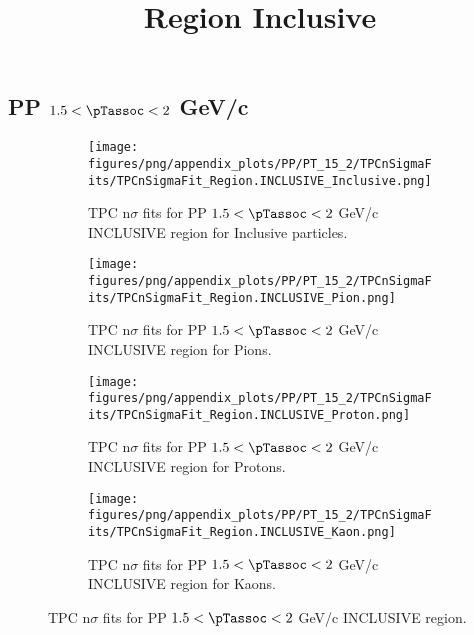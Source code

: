     
            \subsection*{PP $1.5 < \pTassoc < 2$ GeV/c}
            \begin{figure}[H]
                \title{Region Inclusive}
                \begin{subfigure}[b]{0.5\textwidth}
                    \centering
                    \texttt{[image: figures/png/appendix\_plots/PP/PT\_15\_2/TPCnSigmaFits/TPCnSigmaFit\_Region.INCLUSIVE\_Inclusive.png]}
                    \caption{TPC n$\sigma$ fits for PP $1.5 < \pTassoc < 2$ GeV/c INCLUSIVE region for Inclusive particles.}
                    \label{fig:appendix_PP_$1.5 < \pTassoc < 2$ GeV/c_INCLUSIVE_Inclusive}
                \end{subfigure}
                \begin{subfigure}[b]{0.5\textwidth}
                    \centering
                    \texttt{[image: figures/png/appendix\_plots/PP/PT\_15\_2/TPCnSigmaFits/TPCnSigmaFit\_Region.INCLUSIVE\_Pion.png]}
                    \caption{TPC n$\sigma$ fits for PP $1.5 < \pTassoc < 2$ GeV/c INCLUSIVE region for Pions.}
                    \label{fig:appendix_PP_$1.5 < \pTassoc < 2$ GeV/c_INCLUSIVE_Pion}
                \end{subfigure}
                \begin{subfigure}[b]{0.5\textwidth}
                    \centering
                    \texttt{[image: figures/png/appendix\_plots/PP/PT\_15\_2/TPCnSigmaFits/TPCnSigmaFit\_Region.INCLUSIVE\_Proton.png]}
                    \caption{TPC n$\sigma$ fits for PP $1.5 < \pTassoc < 2$ GeV/c INCLUSIVE region for Protons.}
                    \label{fig:appendix_PP_$1.5 < \pTassoc < 2$ GeV/c_INCLUSIVE_Proton}
                \end{subfigure}
                \begin{subfigure}[b]{0.5\textwidth}
                    \centering
                    \texttt{[image: figures/png/appendix\_plots/PP/PT\_15\_2/TPCnSigmaFits/TPCnSigmaFit\_Region.INCLUSIVE\_Kaon.png]}
                    \caption{TPC n$\sigma$ fits for PP $1.5 < \pTassoc < 2$ GeV/c INCLUSIVE region for Kaons.}
                    \label{fig:appendix_PP_$1.5 < \pTassoc < 2$ GeV/c_INCLUSIVE_Kaon}
                \end{subfigure}
                \caption{TPC n$\sigma$ fits for PP $1.5 < \pTassoc < 2$ GeV/c INCLUSIVE region.}
                \label{fig:appendix_PP_$1.5 < \pTassoc < 2$ GeV/c_INCLUSIVE}
            \end{figure}
